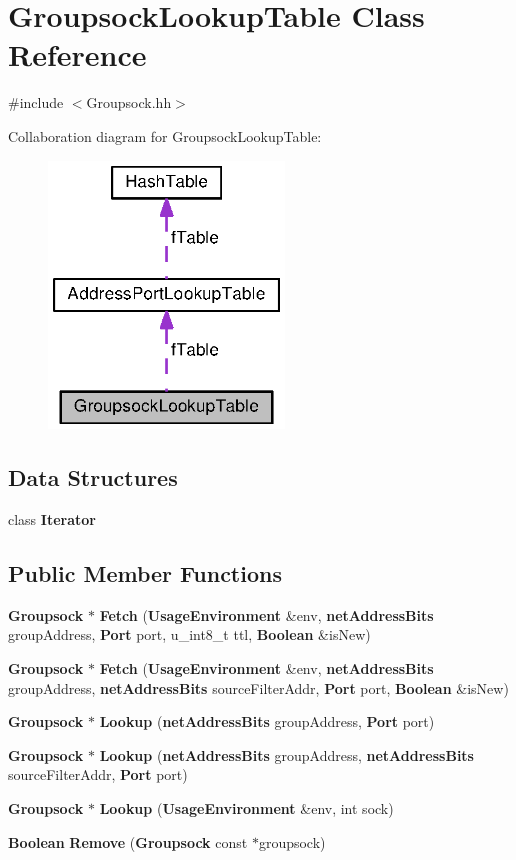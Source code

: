 \section{Groupsock\+Lookup\+Table Class Reference}
\label{classGroupsockLookupTable}


{\ttfamily \#include $<$Groupsock.\+hh$>$}



Collaboration diagram for Groupsock\+Lookup\+Table\+:
\nopagebreak
\begin{figure}[H]
\begin{center}
\leavevmode
\includegraphics[width=178pt]{classGroupsockLookupTable__coll__graph}
\end{center}
\end{figure}
\subsection*{Data Structures}
\begin{DoxyCompactItemize}
\item 
class {\bf Iterator}
\end{DoxyCompactItemize}
\subsection*{Public Member Functions}
\begin{DoxyCompactItemize}
\item 
{\bf Groupsock} $\ast$ {\bf Fetch} ({\bf Usage\+Environment} \&env, {\bf net\+Address\+Bits} group\+Address, {\bf Port} port, u\+\_\+int8\+\_\+t ttl, {\bf Boolean} \&is\+New)
\item 
{\bf Groupsock} $\ast$ {\bf Fetch} ({\bf Usage\+Environment} \&env, {\bf net\+Address\+Bits} group\+Address, {\bf net\+Address\+Bits} source\+Filter\+Addr, {\bf Port} port, {\bf Boolean} \&is\+New)
\item 
{\bf Groupsock} $\ast$ {\bf Lookup} ({\bf net\+Address\+Bits} group\+Address, {\bf Port} port)
\item 
{\bf Groupsock} $\ast$ {\bf Lookup} ({\bf net\+Address\+Bits} group\+Address, {\bf net\+Address\+Bits} source\+Filter\+Addr, {\bf Port} port)
\item 
{\bf Groupsock} $\ast$ {\bf Lookup} ({\bf Usage\+Environment} \&env, int sock)
\item 
{\bf Boolean} {\bf Remove} ({\bf Groupsock} const $\ast$groupsock)
\end{DoxyCompactItemize}

